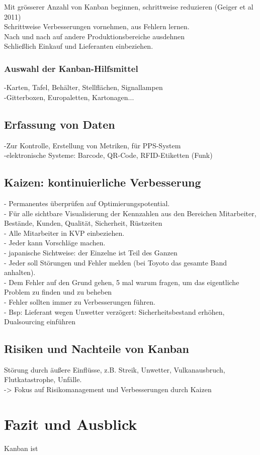 Mit grösserer Anzahl von Kanban beginnen, schrittweise reduzieren (Geiger et al 2011)\\
Schrittweise Verbesserungen vornehmen, aus Fehlern lernen.\\
Nach und nach auf andere Produktionsbereiche ausdehnen\\
Schließlich Einkauf und Lieferanten einbeziehen.\\

\subsubsection{Auswahl der Kanban-Hilfsmittel}
-Karten, Tafel, Behälter, Stellflächen, Signallampen\\
-Gitterboxen, Europaletten, Kartonagen...\\

\subsection{Erfassung von Daten}
-Zur Kontrolle, Erstellung von Metriken, für PPS-System\\
-elektronische Systeme: Barcode, QR-Code, RFID-Etiketten (Funk)\\

\subsection{Kaizen: kontinuierliche Verbesserung}
- Permanentes überprüfen auf Optimierungspotential.\\
- Für alle sichtbare Visualisierung der Kennzahlen aus den Bereichen Mitarbeiter, Bestände, Kunden, Qualität, Sicherheit, Rüstzeiten\\
- Alle Mitarbeiter in KVP einbeziehen.\\
- Jeder kann Vorschläge machen.\\
- japanische Sichtweise: der Einzelne ist Teil des Ganzen\\
- Jeder soll Störungen und Fehler melden (bei Toyoto das gesamte Band anhalten).\\
- Dem Fehler auf den Grund gehen, 5 mal warum fragen, um das eigentliche Problem zu finden und zu beheben\\
- Fehler sollten immer zu Verbesserungen führen.\\
- Bsp: Lieferant wegen Unwetter verzögert: Sicherheitsbestand erhöhen, Dualsourcing einführen\\

\subsection{Risiken und Nachteile von Kanban}
Störung durch äußere Einflüsse, z.B. Streik, Unwetter, Vulkanausbruch, Flutkatastrophe, Unfälle.\\
-> Fokus auf Risikomanagement und Verbesserungen durch Kaizen\\

\section{Fazit und Ausblick}
Kanban ist 
